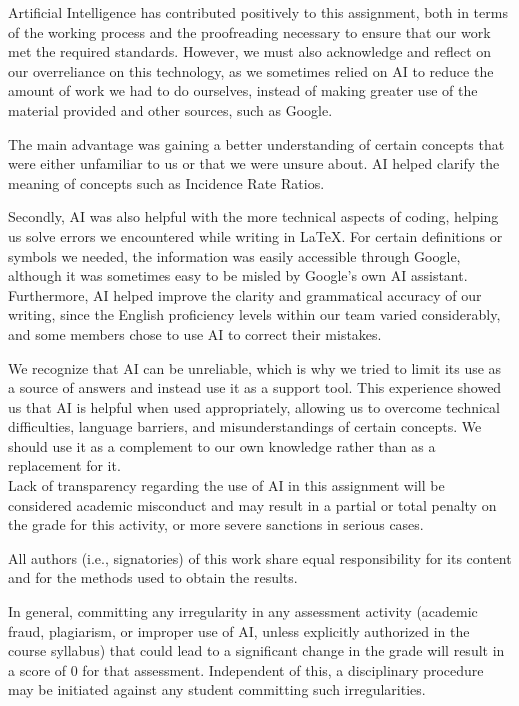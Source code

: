 \documentclass[10pt,a4paper,twoside]{article}\usepackage[]{graphicx}\usepackage[]{xcolor}
\begin{document}
Artificial Intelligence has contributed positively to this assignment, both in terms of the working process and the proofreading necessary to ensure that our work met the required standards. However, we must also acknowledge and reflect on our overreliance on this technology, as we sometimes relied on AI to reduce the amount of work we had to do ourselves, instead of making greater use of the material provided and other sources, such as Google.

The main advantage was gaining a better understanding of certain concepts that were either unfamiliar to us or that we were unsure about. AI helped clarify the meaning of concepts such as Incidence Rate Ratios.

Secondly, AI was also helpful with the more technical aspects of coding, helping us solve errors we encountered while writing in \LaTeX. For certain definitions or symbols we needed, the information was easily accessible through Google, although it was sometimes easy to be misled by Google's own AI assistant. Furthermore, AI helped improve the clarity and grammatical accuracy of our writing, since the English proficiency levels within our team varied considerably, and some members chose to use AI to correct their mistakes.

We recognize that AI can be unreliable, which is why we tried to limit its use as a source of answers and instead use it as a support tool. This experience showed us that AI is helpful when used appropriately, allowing us to overcome technical difficulties, language barriers, and misunderstandings of certain concepts. We should use it as a complement to our own knowledge rather than as a replacement for it.
\[
\]
Lack of transparency regarding the use of AI in this assignment will be considered academic misconduct and may result in a partial or total penalty on the grade for this activity, or more severe sanctions in serious cases.

All authors (i.e., signatories) of this work share equal responsibility for its content and for the methods used to obtain the results. 

In general, committing any irregularity in any assessment activity (academic fraud, plagiarism, or improper use of AI, unless explicitly authorized in the course syllabus) that could lead to a significant change in the grade will result in a score of 0 for that assessment. Independent of this, a disciplinary procedure may be initiated against any student committing such irregularities.
\end{document}
